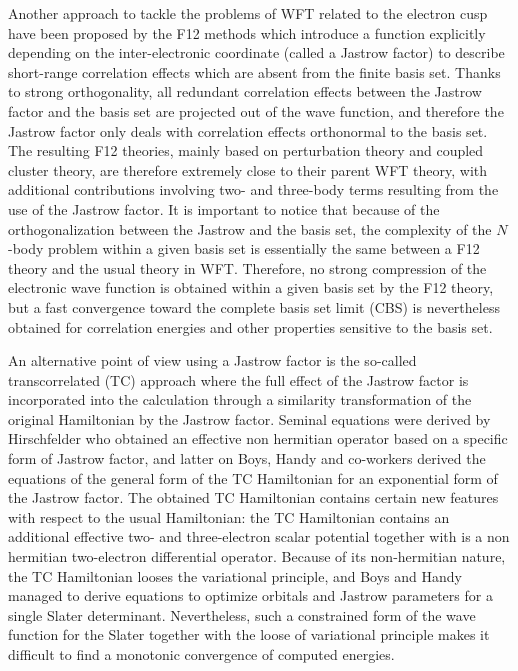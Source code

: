 \documentclass[aip,jcp,reprint,noshowkeys,superscriptaddress]{revtex4-1}
\begin{document}
Another approach to tackle the problems of WFT related to the electron cusp have been proposed by the F12 methods which introduce a function explicitly depending on the inter-electronic coordinate\cite{Ten-TCA-12,TenNog-WIREs-12,HatKloKohTew-CR-12, KonBisVal-CR-12, GruHirOhnTen-JCP-17, MaWer-WIREs-18} (called a Jastrow factor) to describe short-range correlation effects which are absent from the finite basis set. Thanks to strong orthogonality, 
all redundant correlation effects between the Jastrow factor and the basis set are projected out of the wave function, 
and therefore the Jastrow factor only deals with correlation effects orthonormal to the basis set. 
The resulting F12 theories, mainly based on perturbation theory and coupled cluster theory, are therefore 
extremely close to their parent WFT theory, with additional contributions involving two- and three-body terms resulting from the use of the Jastrow factor. 
It is important to notice that because of the orthogonalization between the Jastrow and the basis set, 
the complexity of the $N$-body problem within a given basis set is essentially the same between a F12 theory and the usual theory in WFT. Therefore, no strong compression of the electronic wave function is obtained within a given basis set by the F12 theory, 
but a fast convergence toward the complete basis set limit (CBS) is nevertheless obtained for correlation energies and other properties sensitive to the basis set.  

An alternative point of view using a Jastrow factor is the so-called transcorrelated (TC) approach where the full effect of the Jastrow factor is incorporated into the calculation through a similarity transformation of the original Hamiltonian by the Jastrow factor. 
Seminal equations were derived by Hirschfelder\cite{Hirschfelder-JCP-63} who obtained an effective non hermitian operator based on a specific form of Jastrow factor, and latter on Boys, Handy and co-workers\cite{BoyHan-PRSLA-69,BoyHanLin-1-PRSLA-69,BoyHanLin-2-PRSLA-69} derived the equations of the general form of the TC Hamiltonian for an exponential form of the Jastrow factor. 
The obtained TC Hamiltonian contains certain new features with respect to the usual Hamiltonian: the TC Hamiltonian contains an additional effective two- and three-electron scalar potential together with is a non hermitian two-electron differential operator. Because of its non-hermitian nature, the TC Hamiltonian looses the variational principle, and Boys and Handy managed to derive equations to optimize orbitals and Jastrow parameters for a single Slater determinant. 
Nevertheless, such a constrained form of the wave function for the Slater together with the loose of variational principle makes it difficult to find a monotonic convergence of computed energies\cite{Handy-MolPhys-71}. 
\end{document}
